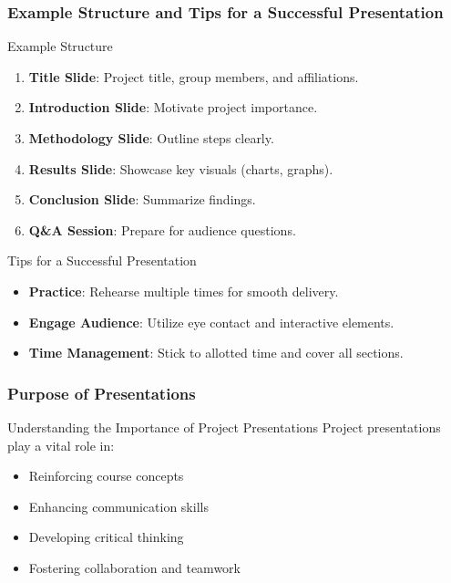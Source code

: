 \documentclass[aspectratio=169]{beamer}
\begin{document}
\begin{frame}[fragile]
    \frametitle{Example Structure and Tips for a Successful Presentation}
    \begin{block}{Example Structure}
        \begin{enumerate}
            \item \textbf{Title Slide}: Project title, group members, and affiliations.
            \item \textbf{Introduction Slide}: Motivate project importance.
            \item \textbf{Methodology Slide}: Outline steps clearly.
            \item \textbf{Results Slide}: Showcase key visuals (charts, graphs).
            \item \textbf{Conclusion Slide}: Summarize findings.
            \item \textbf{Q\&A Session}: Prepare for audience questions.
        \end{enumerate}
    \end{block}

    \begin{block}{Tips for a Successful Presentation}
        \begin{itemize}
            \item \textbf{Practice}: Rehearse multiple times for smooth delivery.
            \item \textbf{Engage Audience}: Utilize eye contact and interactive elements.
            \item \textbf{Time Management}: Stick to allotted time and cover all sections.
        \end{itemize}
    \end{block}
\end{frame}

\begin{frame}[fragile]
    \frametitle{Purpose of Presentations}
    \begin{block}{Understanding the Importance of Project Presentations}
        Project presentations play a vital role in:
        \begin{itemize}
            \item Reinforcing course concepts
            \item Enhancing communication skills
            \item Developing critical thinking
            \item Fostering collaboration and teamwork
        \end{itemize}
    \end{block}
\end{frame}
\end{document}
